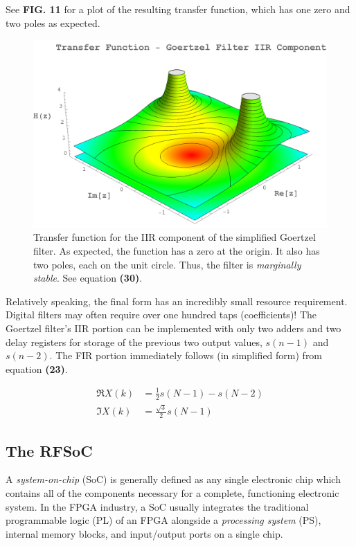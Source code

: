 \documentclass[reprint,amsmath,amssymb]{revtex4-2}
\begin{document}
See \textbf{FIG. 11} for a plot of the resulting transfer function, which has one zero and two poles as expected.

\begin{figure}
    \centering
    \includegraphics[width=\linewidth]{figs/transfer_function.png}
    \caption{Transfer function for the IIR component of the simplified Goertzel filter. As expected, the function has a zero at the origin. It also has two poles, each on the unit circle. Thus, the filter is \textit{marginally stable}. See equation \textbf{(30)}. }
    \label{fig:11}
\end{figure}

Relatively speaking, the final form has an incredibly small resource requirement. Digital filters may often require over one hundred taps (coefficients)! The Goertzel filter's IIR portion can be implemented with only two adders and two delay registers for storage of the previous two output values, $s(n-1)$ and $s(n-2)$. The FIR portion immediately follows (in simplified form) from equation \textbf{(23)}.

\begin{align}
    \Re{X(k)} & = \frac{1}{2} s(N-1) - s(N-2) \nonumber \\ 
    \Im{X(k)} & = \frac{\sqrt{3}}{2} s(N-1)
\end{align}

\subsection{The RFSoC}

A \textit{system-on-chip} (SoC) is generally defined as any single electronic chip which contains all of the components necessary for a complete, functioning electronic system. In the FPGA industry, a SoC usually integrates the traditional programmable logic (PL) of an FPGA alongside a \textit{processing system} (PS), internal memory blocks, and input/output ports on a single chip.
\end{document}
